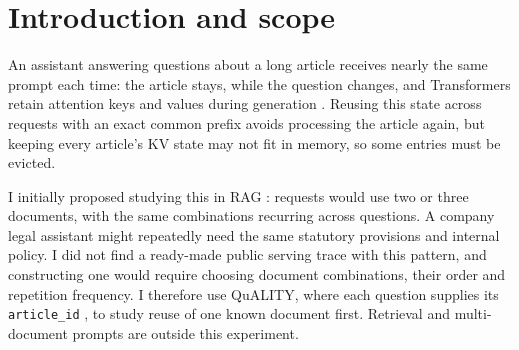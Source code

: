 \documentclass{article}
\begin{document}

\printAffiliationsAndNotice{}

\begin{abstract}
Answering several questions about one document makes a language model process
much of the same input repeatedly. I study whether caching each document's
KV state as one entry can reduce this work and simplify cache management.
I compare document, fixed-block and radix caches with Qwen2.5-1.5B on
QuALITY, where each question supplies its article. Over 2,086 requests, document/LRU
reduces mean time to first token (TTFT) by 21.9\% with random ordering and
63.5\% with Zipf traffic. CPU INT8 increases capacity but changes 12 answers
on the random trace. In smaller experiments,
a page arena does not improve latency in the Transformers runner, while a
Triton kernel speeds up INT8 restoration by $1.209\times$ after warm-up.
\end{abstract}

\section{Introduction and scope}

An assistant answering questions about a long article receives nearly the
same prompt each time: the article stays, while the question changes, and
Transformers retain attention keys and values during generation
\cite{vaswani2017attention}. Reusing this state across requests with an exact
common prefix avoids processing the article again, but keeping every article's
KV state may not fit in memory, so some entries must be evicted.

I initially proposed studying this in RAG \cite{lewis2020rag}: requests would
use two or three documents, with the same combinations recurring across
questions. A company legal assistant might repeatedly need the same statutory
provisions and internal policy. I did not find a ready-made public serving
trace with this pattern, and constructing one would require choosing document
combinations, their order and repetition frequency. I therefore use QuALITY,
where each question supplies its \texttt{article\_id} \cite{pang2022quality},
to study reuse of one known document first. Retrieval and multi-document
prompts are outside this experiment.
\end{document}
